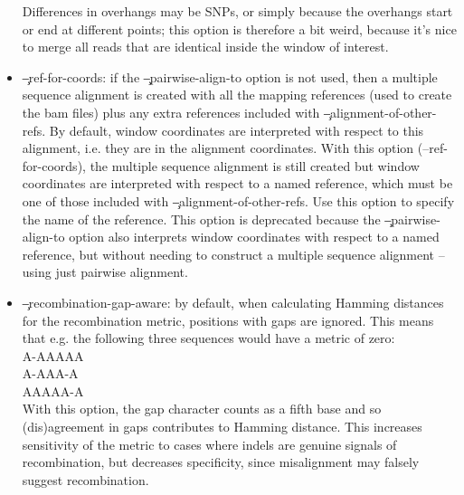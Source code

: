 \begin{itemize}
Differences in overhangs may be SNPs, or simply because the overhangs start or end at different points; this
option is therefore a bit weird, because it's nice to merge all reads that are identical inside the window of interest.
\item \c{--ref-for-coords}: if the \c{--pairwise-align-to} option is not used, then a multiple sequence alignment is created with all the mapping references (used to create the bam files) plus any extra references included with \c{--alignment-of-other-refs}.
By default, window coordinates are interpreted with respect to this alignment, i.e. they are in the alignment
coordinates.
With this option (--ref-for-coords), the multiple sequence alignment is still created but window coordinates are interpreted with respect to a named reference, which must be one of those included with \c{--alignment-of-other-refs}.
Use this option to specify the name of the reference.
This option is deprecated because the \c{--pairwise-align-to} option also interprets window coordinates with respect to a named reference, but without needing to construct a multiple sequence alignment -- using just pairwise alignment.
\item \c{--recombination-gap-aware}: by default, when calculating Hamming distances for the recombination
metric, positions with gaps are ignored.
This means that e.g. the following three sequences would have a metric of zero:\\
{\ttfamily A-AAAAA\\
A-AAA-A\\
AAAAA-A}\\
With this option, the gap character counts as a fifth base and so (dis)agreement in gaps contributes to Hamming distance.
This increases sensitivity of the metric to cases where indels are genuine signals of recombination, but decreases specificity, since misalignment may falsely suggest recombination.
\end{itemize}





